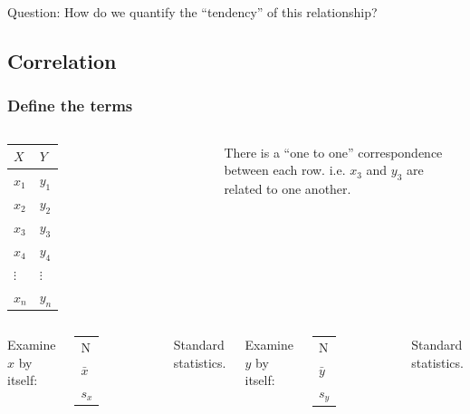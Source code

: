 \begin{frame}
  Question: How do we quantify the ``tendency'' of this relationship?
\end{frame}


\subsection{Correlation}


\begin{frame}
  \frametitle{Define the terms}

  \begin{columns}

    \begin{tabular}{l|l}
      $X$ & $Y$ \\ \hline
      $x_1$ & $y_1$ \\
      $x_2$ & $y_2$ \\
      $x_3$ & $y_3$ \\
      $x_4$ & $y_4$ \\
      $\vdots$ & $\vdots$ \\
      $x_n$ & $y_n$ \\
    \end{tabular}


    \vfill


    {
      There is a ``one to one'' correspondence between each
      row. i.e. $x_3$ and $y_3$ are related to one another.

    }

    \vfill

  \end{columns}


  \begin{columns}

     {

      Examine $x$ by itself: \\
      \begin{tabular}{l}
        N \\
        $\bar{x}$ \\
        $s_x$
      \end{tabular}

      Standard statistics.

    }
      


     {

      Examine $y$ by itself: \\
      \begin{tabular}{l}
        N \\
        $\bar{y}$ \\
        $s_y$
      \end{tabular}

      Standard statistics.


    }


  \end{columns}


\end{frame}

